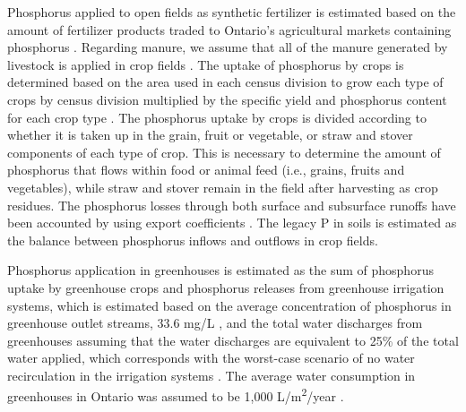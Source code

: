 \documentclass[]{elsarticle}
\begin{document}
Phosphorus applied to open fields as synthetic fertilizer is estimated based on the amount of fertilizer products traded to Ontario’s agricultural markets containing phosphorus \citep{FertilizerShipments}. 
Regarding manure, we assume that all of the manure generated by livestock is applied in crop fields \citep{IROWC_PHandbook}. The uptake of phosphorus by crops is determined based on the area used in each census division \citep{CensusDivisionOpendatasoft} to grow each type of crops by census division \citep{FieldCropsCensus,FieldVegetablesCensus,GreenhousesCensus} multiplied by the specific yield and phosphorus content for each crop type \citep{USDAHandbook}.  The phosphorus uptake by crops is divided according to whether it is taken up in the grain, fruit or vegetable, or straw and stover components of each type of crop. This is necessary to determine the amount of phosphorus that flows within food or animal feed (i.e., grains, fruits and vegetables), while straw and stover remain in the field after harvesting as crop residues. The phosphorus losses through both surface and subsurface runoffs have been accounted by using export coefficients \citep{zhang2015tile, wang2018solid,tan2011surface}. The legacy P in soils is estimated as the balance between phosphorus inflows and outflows in crop fields.

Phosphorus application in greenhouses is estimated as the sum of phosphorus uptake by greenhouse crops \citep{HorticulturalOntario} and phosphorus releases from greenhouse irrigation systems, which is estimated based on the average concentration of phosphorus in greenhouse outlet streams, 33.6 mg/L \citep{GreenhouseReleases}, and the total water discharges from greenhouses assuming that the water discharges are equivalent to 25\% of the total water applied, which corresponds with the worst-case scenario of no water recirculation in the irrigation systems \citep{GNFOntario}. The average water consumption in greenhouses in Ontario was assumed to be 1,000 L/m\textsuperscript{2}/year \citep{GrowingVeggiesOntario}.
\end{document}
